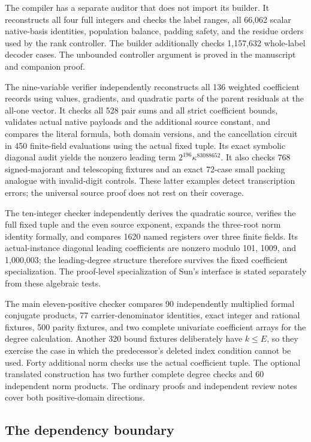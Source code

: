 The compiler has a separate auditor that does not import its builder.
It reconstructs all four full integers and checks the label ranges,
all 66,062 scalar native-basis identities, population balance,
padding safety, and the residue orders used by the rank controller.
The builder additionally checks 1,157,632 whole-label decoder cases.
The unbounded
controller argument is proved in the manuscript and companion proof.

The nine-variable verifier independently reconstructs all 136 weighted
coefficient records using values, gradients, and quadratic parts of
the parent residuals at the all-one vector. It checks all 528 pair
sums and all strict coefficient bounds, validates actual native
payloads and the additional source constant, and compares the literal
formula, both domain versions, and the cancellation circuit in 450
finite-field evaluations using the actual fixed tuple. Its exact
symbolic diagonal audit yields the nonzero leading term
$2^{196}\kappa^{83088652}$. It also checks 768 signed-majorant and
telescoping fixtures and an exact 72-case small packing analogue with
invalid-digit controls. These latter examples detect transcription
errors; the universal source proof does not rest on their coverage.

The ten-integer checker independently derives the quadratic source,
verifies the full fixed tuple and the even source exponent, expands
the three-root norm identity formally, and compares 1620 named
registers over three finite fields. Its actual-instance diagonal
leading coefficients are nonzero modulo 101, 1009, and 1,000,003;
the leading-degree structure therefore survives the fixed coefficient
specialization. The proof-level specialization of Sun's interface is
stated separately from these algebraic tests.

The main eleven-positive checker compares 90 independently multiplied
formal conjugate products, 77 carrier-denominator identities, exact
integer and rational fixtures, 500 parity fixtures, and two complete
univariate coefficient arrays for the degree calculation. Another
320 bound fixtures deliberately have $k\le E$, so they exercise the
case in which the predecessor's deleted index condition cannot be
used. Forty additional norm checks use the actual coefficient tuple.
The optional translated construction has two further complete degree
checks and 60 independent norm products. The ordinary proofs and
independent review notes cover both positive-domain directions.

\subsection{The dependency boundary}


